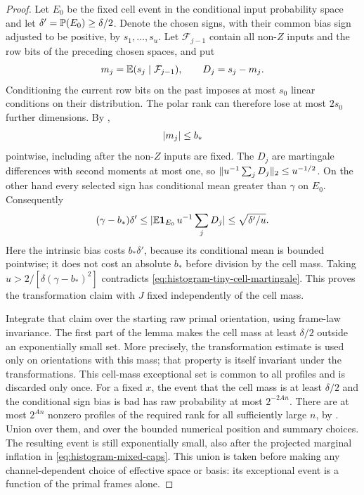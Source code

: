 \begin{proof}
Let $E_0$ be the fixed cell event in the conditional input probability
space and let $\delta'=\mathbb P(E_0)\ge\delta/2$. Denote the chosen signs,
with their common bias sign adjusted to be positive, by $s_1,\ldots,s_u$.
Let $\mathcal F_{j-1}$ contain all non-$Z$ inputs and the row bits of
the preceding chosen spaces, and put
\[
 m_j=\mathbb E(s_j\mid\mathcal F_{j-1}),\qquad D_j=s_j-m_j.
\]
Conditioning the current row bits on the past imposes at most $s_0$
linear conditions on their distribution. The polar rank can therefore
lose at most $2s_0$ further dimensions. By
,
\[
 \lvert m_j\rvert\le b_*
\]
pointwise, including after the non-$Z$ inputs are fixed. The $D_j$ are
martingale differences with second moments at most one, so
$\lVert u^{-1}\sum_jD_j\rVert_2\le u^{-1/2}$. On the other hand every
selected sign has conditional mean greater than $\gamma$ on $E_0$.
Consequently
\begin{equation}\label{eq:histogram-tiny-cell-martingale}
 (\gamma-b_*)\delta'
 \le \lvert \mathbb E\mathbf 1_{E_0}\,u^{-1}\sum_jD_j\rvert
 \le\sqrt{\delta'/u}.
\end{equation}
Here the intrinsic bias costs $b_*\delta'$, because its conditional
mean is bounded pointwise; it does not cost an absolute $b_*$ before
division by the cell mass. Taking
$u>2/[\delta(\gamma-b_*)^2]$ contradicts
\eqref{eq:histogram-tiny-cell-martingale}. This proves the transformation
claim with $J$ fixed independently of the cell mass.

Integrate that claim over the starting raw primal orientation, using frame-law
invariance. The first part of the lemma makes the cell mass at least
$\delta/2$ outside an exponentially small set. More precisely, the
transformation estimate is used only on orientations with this mass;
that property is itself invariant under the transformations. This
cell-mass exceptional set is common to all profiles and is discarded
only once. For a fixed $x$, the event that the cell mass is at least
$\delta/2$ and the conditional sign bias is bad has raw probability
at most $2^{-2An}$. There are at most $2^{An}$ nonzero
profiles of the required rank for all sufficiently large $n$, by
. Union over them, and over the bounded
numerical position and summary choices. The resulting event is still
exponentially small, also after the projected marginal inflation in
\eqref{eq:histogram-mixed-caps}. This union is taken before making
any channel-dependent choice of effective space or basis: its
exceptional event is a function of the primal frames alone.


\end{proof}
